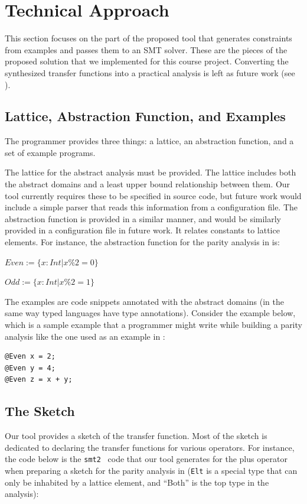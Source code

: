 \documentclass[10pt,conference]{IEEEtran}
\begin{document}
\section{Technical Approach}
\label{sec-tech}

This section focuses on the part of the proposed tool that generates
constraints from examples and passes them to an SMT solver. These are
the pieces of the proposed solution that we implemented for this course
project. Converting the synthesized transfer functions into a practical
analysis is left as future work (see ).

\subsection{Lattice, Abstraction Function, and Examples}
\label{sec-input}

The programmer provides three things: a lattice,
an abstraction function, and a set of example programs.

The lattice for the abstract analysis must be provided.
The lattice includes both the abstract domains and a least
upper bound relationship between them. Our tool currently
requires these to be specified in source code, but future
work would include a simple parser that reads this information
from a configuration file. The abstraction function is provided
in a similar manner, and would be similarly provided in a configuration
file in future work. It relates constants to lattice elements.
For instance, the abstraction function for the parity analysis
in  is:

$Even := \{ x : Int | x \% 2 = 0 \}$

$Odd := \{ x : Int | x \% 2 = 1 \}$

The examples are code snippets annotated with the
abstract domains (in the same way typed languages have type annotations).
Consider the example below, which is a sample example that a
programmer might write while building a parity analysis like the one
used as an example in :

\begin{lstlisting}
@Even x = 2;
@Even y = 4;
@Even z = x + y;
\end{lstlisting}

\subsection{The Sketch}
\label{sec-sketch}

Our tool provides a sketch of the transfer function. Most of the
sketch is dedicated to declaring the transfer functions for various
operators. For instance, the code below is the \lstinline{smt2}~\cite{smt2}
code that our tool generates for the plus operator when preparing
a sketch for the parity analysis in  (\lstinline{Elt} is
a special type that can only be inhabited by a lattice element,
and ``Both'' is the top type in the analysis):
\end{document}
